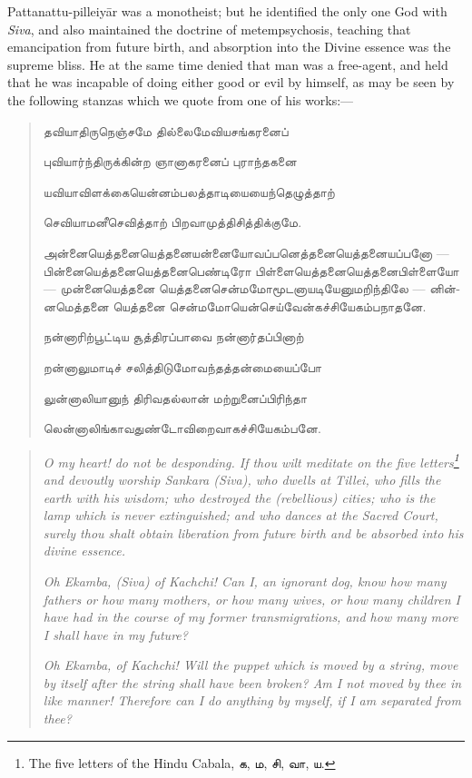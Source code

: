 \documentclass{article}
\newcommand{\TamilText}[1]{\texttamil{#1}}
\newcommand{\tam}[1]{\TamilText{#1}}
\begin{document}
Pattanattu-pilleiy\={a}r was a monotheist; but he identified the only one God with \emph{Siva}, and also maintained the doctrine of metempsychosis, teaching that emancipation from future birth, and absorption into the Divine essence was the supreme bliss. He at the same time denied that man was a free-agent, and held that he was incapable of doing either good or evil by himself, as may be seen by the following stanzas which we quote from one of his works:---
\begin{quotation}\small
\tam{தவியாதிருநெஞ்சமே தில்லைமேவியசங்கரனைப்‌}

\tam{புவியார்ந்திருக்கின்ற ஞானாகரனைப்‌ புராந்தகனை}

\tam{யவியாவிளக்கையென்னம்பலத்தாடியையைந்தெழுத்தாற்‌}

\tam{செவியாமனீசெவித்தாற்‌ பிறவாமுத்திசித்திக்குமே}.

\bigskip

\tam{அன்னையெத்தனையெத்தனையன்னையோவப்பனெத்தனையெத்தனையப்பனோ} --- \tam{பின்னையெத்தனையெத்தனைபெண்டிரோ பிள்ளையெத்தனையெத்தனைபிள்ளையோ} --- \tam{முன்னையெத்தனை யெத்தனைசென்மமோமூடனாயடியேனுமறிந்திலே} --- \tam{னின்னமெத்தனை யெத்தனை சென்மமோயென்செய்வேன்‌கச்சியேகம்பநாதனே}.

\bigskip

\tam{நன்னாரிற்பூட்டிய சூத்திரப்பாவை நன்னார்தப்‌பினாற்}

\tam{றன்னாலுமாடிச்‌ சலித்திடுமோவந்தத்தன்மையைப்போ}

\tam{லுன்னாலியானுந் திரிவதல்லான்‌ மற்றுனைப்பிரிந்தா}

\tam{லென்னாலிங்காவதுண்டோவிறைவாகச்‌சியேகம்பனே}.
\end{quotation}
\begin{quotation}\small
\emph{O my heart! do not be desponding. If thou wilt meditate on the five letters\footnote{The five letters of the Hindu Cabala, \tam{க}, \tam{ம}, \tam{சி}, \tam{வா}, \tam{ய}.} and devoutly worship Sankara (Siva), who dwells at Tillei, who fills the earth with his wisdom; who destroyed the (rebellious) cities; who is the lamp which is never extinguished; and who dances at the Sacred Court, surely thou shalt obtain liberation from future birth and be absorbed into his divine essence.}

\emph{Oh Ekamba, (Siva) of Kachchi! Can I, an ignorant dog, know how many fathers or how many mothers, or how many wives, or how many children I have had in the course of my former transmigrations, and how many more I shall have in my future?}

\emph{Oh Ekamba, of Kachchi! Will the puppet which is moved by a string, move by itself after the string shall have been broken? Am I not moved by thee in like manner! Therefore can I do anything by myself, if I am separated from thee?}
\end{quotation}
\end{document}
